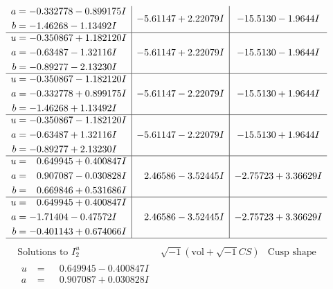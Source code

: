 \documentclass[1p]{elsarticle_modified}
\theoremstyle{definition}
\newcommand{\I}{\sqrt{-1}}
\begin{document}
$$\begin{array}{c|c|c}
\begin{aligned}
a &= -0.332778 - 0.899175 I \\
b &= -1.46268 - 1.13492 I\end{aligned}
 & -5.61147 + 2.22079 I & -15.5130 - 1.9644 I \\ \hline\begin{aligned}
u &= -0.350867 + 1.182120 I \\
a &= -0.63487 - 1.32116 I \\
b &= -0.89277 - 2.13230 I\end{aligned}
 & -5.61147 + 2.22079 I & -15.5130 - 1.9644 I \\ \hline\begin{aligned}
u &= -0.350867 - 1.182120 I \\
a &= -0.332778 + 0.899175 I \\
b &= -1.46268 + 1.13492 I\end{aligned}
 & -5.61147 - 2.22079 I & -15.5130 + 1.9644 I \\ \hline\begin{aligned}
u &= -0.350867 - 1.182120 I \\
a &= -0.63487 + 1.32116 I \\
b &= -0.89277 + 2.13230 I\end{aligned}
 & -5.61147 - 2.22079 I & -15.5130 + 1.9644 I \\ \hline\begin{aligned}
u &= \phantom{-}0.649945 + 0.400847 I \\
a &= \phantom{-}0.907087 - 0.030828 I \\
b &= \phantom{-}0.669846 + 0.531686 I\end{aligned}
 & \phantom{-}2.46586 - 3.52445 I & -2.75723 + 3.36629 I \\ \hline\begin{aligned}
u &= \phantom{-}0.649945 + 0.400847 I \\
a &= -1.71404 - 0.47572 I \\
b &= -0.401143 + 0.674066 I\end{aligned}
 & \phantom{-}2.46586 - 3.52445 I & -2.75723 + 3.36629 I\\
 \hline 
 \end{array}$$\newpage$$\begin{array}{c|c|c}  
\text{Solutions to }I^u_{2}& \I (\text{vol} + \sqrt{-1}CS) & \text{Cusp shape}\\
 \hline 
\begin{aligned}
u &= \phantom{-}0.649945 - 0.400847 I \\
a &= \phantom{-}0.907087 + 0.030828 I \\

\end{aligned}
\end{array}$$
\end{document}
